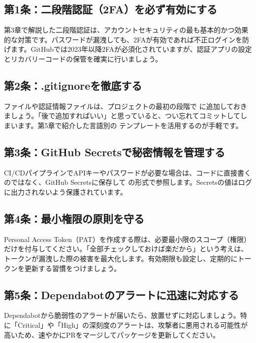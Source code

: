 \subsection{第1条：二段階認証（2FA）を必ず有効にする}

第3章で解説した二段階認証は、アカウントセキュリティの最も基本的かつ効果的な対策です。パスワードが漏洩しても、2FAが有効であれば不正ログインを防げます。GitHubでは2023年以降2FAが必須化されていますが、認証アプリの設定とリカバリーコードの保管を確実に行いましょう。

\subsection{第2条：.gitignoreを徹底する}

 ファイルや認証情報ファイルは、プロジェクトの最初の段階で  に追加しておきましょう。「後で追加すればいい」と思っていると、つい忘れてコミットしてしまいます。第5章で紹介した言語別の  テンプレートを活用するのが手軽です。

\subsection{第3条：GitHub Secretsで秘密情報を管理する}

CI/CDパイプラインでAPIキーやパスワードが必要な場合は、コードに直接書くのではなく、GitHub Secretsに保存して  の形式で参照します。Secretsの値はログに出力されないよう保護されています。

\subsection{第4条：最小権限の原則を守る}

Personal Access Token（PAT）を作成する際は、必要最小限のスコープ（権限）だけを付与してください。「全部チェックしておけば楽だから」という考えは、トークンが漏洩した際の被害を最大化します。有効期限も設定し、定期的にトークンを更新する習慣をつけましょう。

\subsection{第5条：Dependabotのアラートに迅速に対応する}

Dependabotから脆弱性のアラートが届いたら、放置せずに対応しましょう。特に「Critical」や「High」の深刻度のアラートは、攻撃者に悪用される可能性が高いため、速やかにPRをマージしてパッケージを更新してください。

